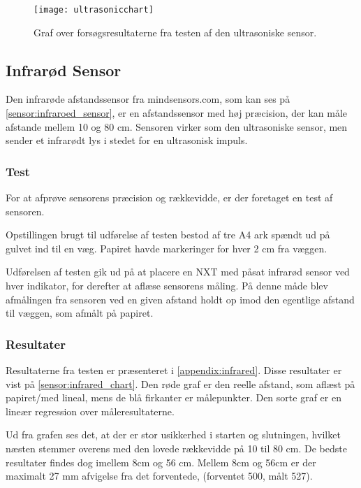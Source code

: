 \begin{figure}[h]
\centering
\texttt{[image: ultrasonicchart]}
\caption{Graf over forsøgsresultaterne fra testen af den ultrasoniske sensor.}
\label{sensor:ultrasonic_resultat_diagram}
\end{figure}



\subsection{Infrarød Sensor}
Den infrarøde afstandssensor fra mindsensors.com, som kan ses på \cref{sensor:infraroed_sensor}, er en afstandssensor med høj præcision, der kan måle afstande mellem 10 og 80 cm.
Sensoren virker som den ultrasoniske sensor, men sender et infrarødt lys i stedet for en ultrasonisk impuls.

\subsubsection{Test}
For at afprøve sensorens præcision og rækkevidde, er der foretaget en test af sensoren.

Opstillingen brugt til udførelse af testen bestod af tre A4 ark spændt ud på gulvet ind til en væg. 
Papiret havde markeringer for hver 2 cm fra væggen.

Udførelsen af testen gik ud på at placere en NXT med påsat infrarød sensor ved hver indikator, for derefter at aflæse sensorens måling.
På denne måde blev afmålingen fra sensoren ved en given afstand holdt op imod den egentlige afstand til væggen, som afmålt på papiret.

\subsubsection{Resultater}

Resultaterne fra testen er præsenteret i \cref{appendix:infrared}. 
Disse resultater er vist på \cref{sensor:infrared_chart}.
Den røde graf er den reelle afstand, som aflæst på papiret/med lineal, mens de blå firkanter er målepunkter.
Den sorte graf er en lineær regression over måleresultaterne.

Ud fra grafen ses det, at der er stor usikkerhed i starten og slutningen, hvilket næsten stemmer overens med den lovede rækkevidde på 10 til 80 cm.
De bedste resultater findes dog imellem 8cm og 56 cm. 
Mellem 8cm og 56cm er der maximalt 27 mm afvigelse fra det forventede, (forventet 500, målt 527).


